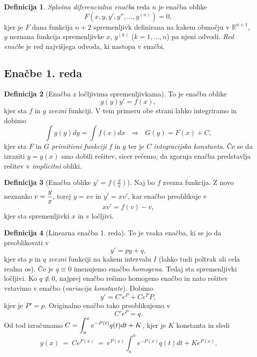 \documentclass[11pt]{article}
\theoremstyle{definition}
\newtheorem{definicija}{Definicija}[section]
\theoremstyle{definition}
\theoremstyle{definition}
\begin{document}
\begin{definicija}

\textit{Splošna diferencialna enačba} reda $n$ je enačba oblike 
$$F(x, y, y', y'', \ldots, y^{(n)}) = 0,$$
kjer je $F$ dana funkcija $n+2$ spremenljivk definirana na kakem območju v $\mathbb{R}^{n+1}$, $y$ neznana funkcija spremenljivke $x$, $y^{(k)}$ ($k = 1, \ldots, n$) pa njeni odvodi. \textit{Red enačbe} je red najvišjega odvoda, ki nastopa v enačbi.

\end{definicija}
\vspace{0.5cm}


\subsection{Enačbe 1. reda}
\vspace{0.5cm}

\begin{definicija}[Enačba z ločljivima spremenljivkama]

To je enačba oblike
$$g(y) y' = f(x),$$
kjer sta $f$ in $g$ \textit{zvezni} funkciji. V tem primeru obe strani lahko integriramo in dobimo
$$\int g(y) dy = \int f(x) dx ~~~\Rightarrow~~~ G(y) = F(x) + C,$$
kjer sta $F$ in $G$ \textit{primitivni funkciji} $f$ in $g$ ter je $C$ \textit{integracijska konstanta}. Če se da izraziti $y = y(x)$ smo dobili rešitev, sicer rečemo, da zgornja enačba predstavlja rešitev v \textit{implicitni} obliki.

\end{definicija}
\vspace{0.5cm}

\begin{definicija}[Enačba oblike $y' = f(\frac{y}{x})$]

Naj bo $f$ zvezna funkcija. Z novo neznanko $v = \cfrac{y}{x}$, torej $y = xv$ in $y' = xv'$, kar enačbo preoblikuje v 
$$xv' = f(v) - v,$$
kjer sta spremenljivki $x$ in $v$ ločljivi.

\end{definicija}
\vspace{0.5cm}

\begin{definicija}[Linearna enačba 1. reda]

To je vsaka enačba, ki se jo da preoblikovati v
$$y' = py + q,$$
kjer sta $p$ in $q$ \textit{zvezni} funkciji na kakem intervalu $I$ (lahko tudi poltrak ali cela realna os). Če je $q \equiv 0$ imenujemo enačbo \textit{homogena}. Tedaj sta spremenljivki ločljivi. Ko $q \not\equiv 0$, najprej enačbo rešimo homogeno enačbo in nato rešitev vstavimo v enačbo (\textit{variacija konstante}). Dobimo
$$y' = C' e^P + C e^P P,$$
kjer je $P' = p$. Originalno enačbo tako preoblikujemo v
$$C' e^P = q.$$
Od tod izračunamo $\mathlarger{C = \int_a^x e^{-P(t)} q(t) dt + K}$, kjer je $K$ konstanta in sledi 
$$y(x) ~=~ C e^{P(x)} ~=~ e^{P(x)} \int_a^x e^{-P(x)} q(t) dt + K e^{P(x)}.$$

\end{definicija}
\vspace{0.5cm}
\end{document}

